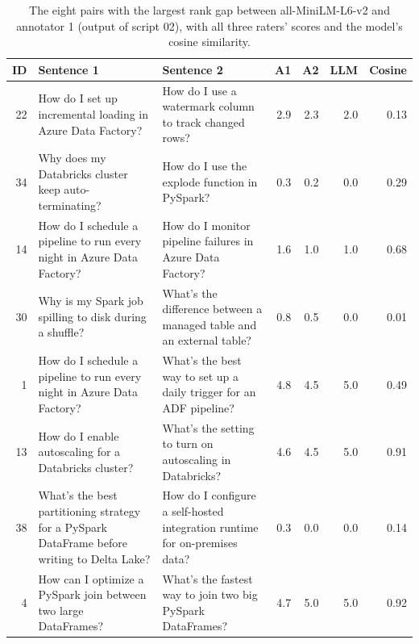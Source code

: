 \documentclass[11pt]{article}
\begin{document}
\begin{table}[t]
\centering\footnotesize\setlength{\tabcolsep}{3pt}
\begin{tabular}{rp{5.0cm}p{5.0cm}rrrr}
\toprule
ID & Sentence 1 & Sentence 2 & A1 & A2 & LLM & Cosine \\
\midrule
22 & How do I set up incremental loading in Azure Data Factory? & How do I use a watermark column to track changed rows? & 2.9 & 2.3 & 2.0 & 0.13 \\
34 & Why does my Databricks cluster keep auto-terminating? & How do I use the explode function in PySpark? & 0.3 & 0.2 & 0.0 & 0.29 \\
14 & How do I schedule a pipeline to run every night in Azure Data Factory? & How do I monitor pipeline failures in Azure Data Factory? & 1.6 & 1.0 & 1.0 & 0.68 \\
30 & Why is my Spark job spilling to disk during a shuffle? & What's the difference between a managed table and an external table? & 0.8 & 0.5 & 0.0 & 0.01 \\
1 & How do I schedule a pipeline to run every night in Azure Data Factory? & What's the best way to set up a daily trigger for an ADF pipeline? & 4.8 & 4.5 & 5.0 & 0.49 \\
13 & How do I enable autoscaling for a Databricks cluster? & What's the setting to turn on autoscaling in Databricks? & 4.6 & 4.5 & 5.0 & 0.91 \\
38 & What's the best partitioning strategy for a PySpark DataFrame before writing to Delta Lake? & How do I configure a self-hosted integration runtime for on-premises data? & 0.3 & 0.0 & 0.0 & 0.14 \\
4 & How can I optimize a PySpark join between two large DataFrames? & What's the fastest way to join two big PySpark DataFrames? & 4.7 & 5.0 & 5.0 & 0.92 \\
\bottomrule
\end{tabular}
\caption{The eight pairs with the largest rank gap between all-MiniLM-L6-v2 and annotator 1 (output of script 02), with all three raters' scores and the model's cosine similarity.}
\label{tab:gaps}
\end{table}
\end{document}
